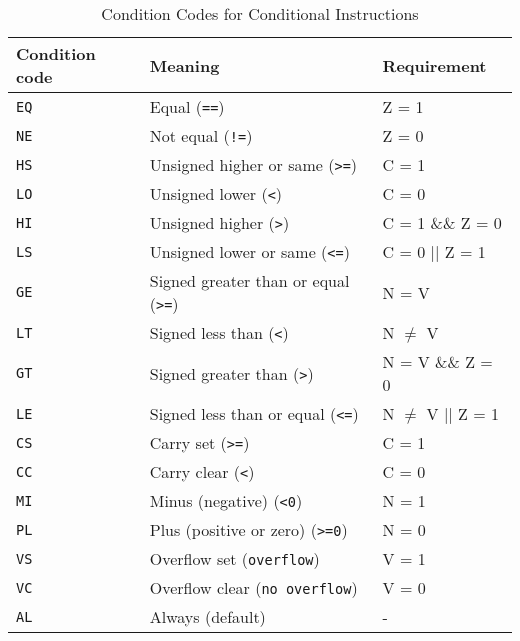 \documentclass[a4paper,12pt,openany]{book}
\begin{document}
\begin{table}[H]
    \centering
    \begin{tabular}{@{}lll@{}}
        \toprule
        Condition code & Meaning & Requirement\\
        \midrule
        \texttt{EQ} & Equal (\texttt{==}) & Z = 1\\
        \texttt{NE} & Not equal (\texttt{!=}) & Z = 0\\
        \texttt{HS} & Unsigned higher or same (\texttt{>=}) & C = 1\\
        \texttt{LO} & Unsigned lower (\texttt{<}) & C = 0\\
        \texttt{HI} & Unsigned higher (\texttt{>}) & C = 1 \&\& Z = 0\\
        \texttt{LS} & Unsigned lower or same (\texttt{<=}) & C = 0 || Z = 1\\
        \texttt{GE} & Signed greater than or equal (\texttt{>=}) & N = V\\
        \texttt{LT} & Signed less than (\texttt{<}) & N $\neq$ V\\
        \texttt{GT} & Signed greater than (\texttt{>}) & N = V \&\& Z = 0\\
        \texttt{LE} & Signed less than or equal (\texttt{<=}) & N $\neq$ V || Z = 1\\
        \texttt{CS} & Carry set (\texttt{>=}) & C = 1\\
        \texttt{CC} & Carry clear (\texttt{<}) & C = 0\\
        \texttt{MI} & Minus (negative) (\texttt{<0}) & N = 1\\
        \texttt{PL} & Plus (positive or zero) (\texttt{>=0}) & N = 0\\
        \texttt{VS} & Overflow set (\texttt{overflow}) & V = 1\\
        \texttt{VC} & Overflow clear (\texttt{no overflow}) & V = 0\\
        \texttt{AL} & Always (default) & -\\
        \bottomrule
    \end{tabular}
    \label{tab:condition_codes}
    \caption{Condition Codes for Conditional Instructions}
\end{table}
\end{document}
